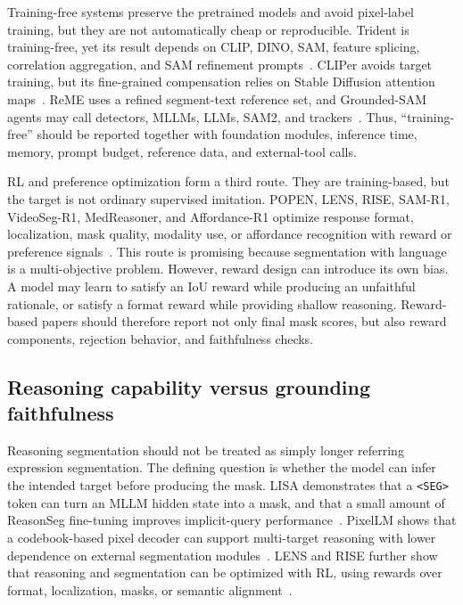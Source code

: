 Training-free systems preserve the pretrained models and avoid pixel-label training, but they are not automatically cheap or reproducible. Trident is training-free, yet its result depends on CLIP, DINO, SAM, feature splicing, correlation aggregation, and SAM refinement prompts~\citep{shiyHarnessingVisionFoundation2025}. CLIPer avoids target training, but its fine-grained compensation relies on Stable Diffusion attention maps~\citep{lsunCliperHierarchicallyImproving2025}. ReME uses a refined segment-text reference set, and Grounded-SAM agents may call detectors, MLLMs, LLMs, SAM2, and trackers~\citep{xxuanReMEDataCentricFramework2025,luoConnectingDotsTrainingFree2026}. Thus, ``training-free'' should be reported together with foundation modules, inference time, memory, prompt budget, reference data, and external-tool calls.

RL and preference optimization form a third route. They are training-based, but the target is not ordinary supervised imitation. POPEN, LENS, RISE, SAM-R1, VideoSeg-R1, MedReasoner, and Affordance-R1 optimize response format, localization, mask quality, modality use, or affordance recognition with reward or preference signals~\citep{zhuPopenPreferencebasedOptimization2025,zhuLensLearningSegment2026,zhouReasoningImplicitSelfsupervised2026,huangSamr1LeveragingSam2026,xuVideosegr1ReasoningVideo2026,yanMedreasonerReinforcementLearning2026,wangAffordancer1ReinforcementLearning2026}. This route is promising because segmentation with language is a multi-objective problem. However, reward design can introduce its own bias. A model may learn to satisfy an IoU reward while producing an unfaithful rationale, or satisfy a format reward while providing shallow reasoning. Reward-based papers should therefore report not only final mask scores, but also reward components, rejection behavior, and faithfulness checks.

\subsection{Reasoning capability versus grounding faithfulness}

Reasoning segmentation should not be treated as simply longer referring expression segmentation. The defining question is whether the model can infer the intended target before producing the mask. LISA demonstrates that a \texttt{<SEG>} token can turn an MLLM hidden state into a mask, and that a small amount of ReasonSeg fine-tuning improves implicit-query performance~\citep{xlaiLisaReasoningSegmentation2024}. PixelLM shows that a codebook-based pixel decoder can support multi-target reasoning with lower dependence on external segmentation modules~\citep{renPixellmPixelReasoning2024}. LENS and RISE further show that reasoning and segmentation can be optimized with RL, using rewards over format, localization, masks, or semantic alignment~\citep{zhuLensLearningSegment2026,zhouReasoningImplicitSelfsupervised2026}.

